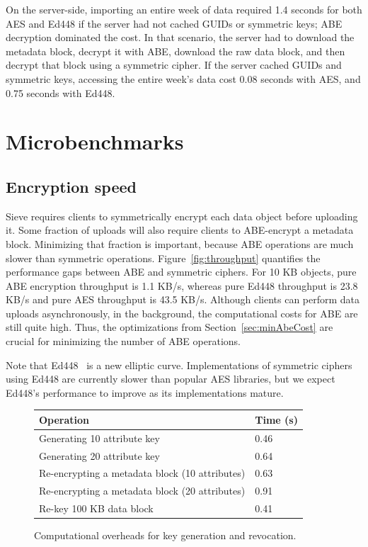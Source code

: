 On the server-side, importing an entire
week of data required 1.4 seconds for both AES 
and Ed448 if the server had not cached GUIDs or symmetric
keys; ABE decryption dominated the cost. 
In that scenario, the server had to
download the metadata block, decrypt it with
ABE, download the raw data block, and then
decrypt that block using a symmetric cipher. 
If the server cached GUIDs and symmetric keys,
accessing the entire week's data cost 0.08 seconds
with AES, and 0.75 seconds with Ed448.

\section{Microbenchmarks}
\subsection{Encryption speed} Sieve requires
clients to symmetrically encrypt each data
object before uploading it. Some fraction of
uploads will also require clients to ABE-encrypt
a metadata block. Minimizing that fraction
is important, because ABE operations are much
slower than symmetric operations. Figure~\ref{fig:throughput}
quantifies the performance gaps between ABE
and symmetric ciphers. For 10 KB objects,
pure ABE encryption throughput is 1.1 KB/s,
whereas pure Ed448 throughput is 23.8 KB/s
and pure AES throughput is 43.5 KB/s.
Although clients can perform data uploads
asynchronously, in the background, the
computational costs for ABE are still quite
high. Thus, the optimizations from
Section~\ref{sec:minAbeCost} are crucial
for minimizing the number of ABE operations.

Note that Ed448~\cite{ed448} is a new elliptic curve.
Implementations of symmetric ciphers using Ed448 
are currently slower than popular AES libraries,
but we expect Ed448's performance to improve as
its implementations mature.

\begin{figure}
\centering
\begin{tabular}{ |p{5.5cm}|p{1.5cm}| }
\hline
Operation & Time (s)\\ \hline
Generating 10 attribute key &  0.46\\ \hline
Generating 20 attribute key & 0.64\\ \hline
Re-encrypting a metadata block (10 attributes) & 0.63 \\ \hline
Re-encrypting a metadata block (20 attributes) & 0.91 \\ \hline
Re-key 100 KB data block & 0.41 \\ \hline
\end{tabular}
\caption{Computational overheads for key generation and revocation.}
\label{fig:sievekey}
\end{figure}

